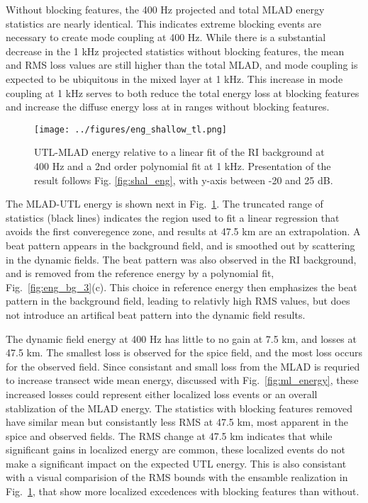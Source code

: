 \documentclass[preprint,NumberedRefs]{JASA}
\begin{document}
Without blocking features, the 400 Hz projected and total MLAD energy statistics are nearly identical. This indicates extreme blocking events are necessary to create mode coupling at 400 Hz. While there is a substantial decrease in the 1 kHz projected statistics without blocking features, the mean and RMS loss values are still higher than the total MLAD, and mode coupling is expected to be ubiquitous in the mixed layer at 1 kHz. This increase in mode coupling at 1 kHz serves to both reduce the total energy loss at blocking features and increase the diffuse energy loss at in ranges without blocking features.
\begin{figure}
\texttt{[image: ../figures/eng\_shallow\_tl.png]}
        \caption{UTL-MLAD energy relative to a linear fit of the RI background at 400 Hz and a 2nd order polynomial fit at 1 kHz. Presentation of the result follows Fig. \ref{fig:shal_eng}, with y-axis between -20 and 25 dB.}
    \label{fig:eng_tl}
\end{figure}
The MLAD-UTL energy is shown next in Fig.~\ref{fig:eng_tl}. The truncated range of statistics (black lines) indicates the region used to fit a linear regression that avoids the first converegence zone, and results at 47.5 km are an extrapolation. A beat pattern appears in the background field, and is smoothed out by scattering in the dynamic fields. The beat pattern was also observed in the RI background, and is removed from the reference energy by a polynomial fit, Fig.~\ref{fig:eng_bg_3}(c). This choice in reference energy then emphasizes the beat pattern in the background field, leading to relativly high RMS values, but does not introduce an artifical beat pattern into the dynamic field results.

The dynamic field energy at 400 Hz has little to no gain at 7.5 km, and losses at 47.5 km. The smallest loss is observed for the spice field, and the most loss occurs for the observed field. Since consistant and small loss from the MLAD is requried to increase transect wide mean energy, discussed with Fig.~\ref{fig:ml_energy}, these increased losses could represent either localized loss events or an overall stablization of the MLAD energy. The statistics with blocking features removed have similar mean but consistantly less RMS at 47.5 km, most apparent in the spice and observed fields. The RMS change at 47.5 km indicates that while significant gains in localized energy are common, these localized events do not make a significant impact on the expected UTL energy. This is also consistant with a visual comparision of the RMS bounds with the ensamble realization in Fig.~\ref{fig:eng_tl}, that show more localized excedences with blocking features than without.
\end{document}
